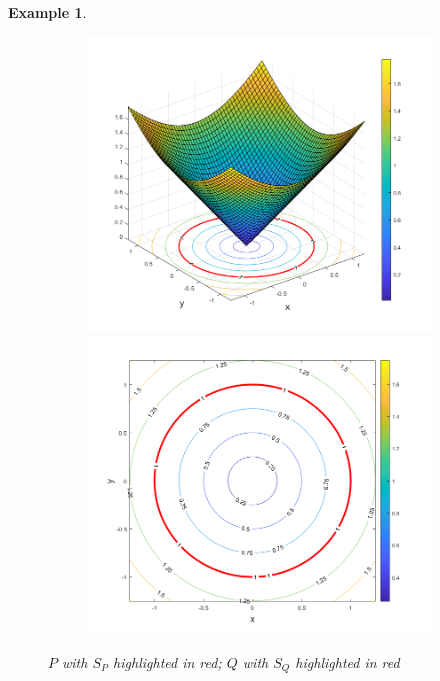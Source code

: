 \documentclass[11pt]{article}
\newtheorem{example}{Example}
\theoremstyle{remark}
\begin{document}
\begin{example}
\begin{figure}[!htb]
    \hspace{-20pt}
    \begin{subfigure}{0.5\textwidth}
    \centering
    \includegraphics[scale=0.4]{Q_and_levelsets.png}
    \vspace{-10pt}
    \includegraphics[scale=0.4]{Q_levelsets.png}
    \end{subfigure}
    \caption{$P$ with $S_P$ highlighted in red; $Q$ with $S_Q$ highlighted in red }
    \label{fig:Weierstrass}
\end{figure}

\end{example}
\end{document}
